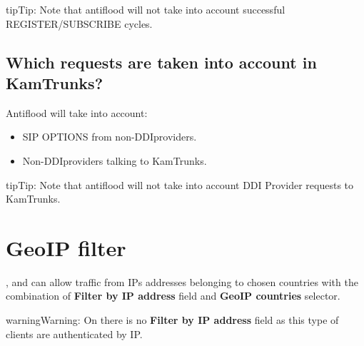 \documentclass[letterpaper,10pt,english]{sphinxmanual}
\begin{document}
\begin{notice}{tip}{Tip:}
Note that antiflood will not take into account successful REGISTER/SUBSCRIBE cycles.
\end{notice}


\subsection{Which requests are taken into account in KamTrunks?}
\label{security_and_maintenance/security/antiflooding:which-requests-are-taken-into-account-in-kamtrunks}
Antiflood will take into account:
\begin{itemize}
\item {} 
SIP OPTIONS from non-DDIproviders.

\item {} 
Non-DDIproviders talking to KamTrunks.

\end{itemize}

\begin{notice}{tip}{Tip:}
Note that antiflood will not take into account DDI Provider requests to KamTrunks.
\end{notice}


\section{GeoIP filter}
\label{security_and_maintenance/security/geoip_filter:geoip-filter}\label{security_and_maintenance/security/geoip_filter::doc}\label{security_and_maintenance/security/geoip_filter:id1}
{\hyperref[administration_portal/client/vpbx/index:vpbx\string-clients]{}}, {\hyperref[administration_portal/client/retail/index:retail\string-clients]{}} and {\hyperref[administration_portal/client/residential/index:residential\string-clients]{}} can allow traffic from
IPs addresses belonging to chosen countries with the combination of \textbf{Filter by IP address} field and \textbf{GeoIP countries} selector.

\begin{notice}{warning}{Warning:}
On {\hyperref[administration_portal/client/wholesale/index:wholesale\string-clients]{}} there is no \textbf{Filter by IP address} field as this type of clients are authenticated by IP.
\end{notice}
\end{document}
